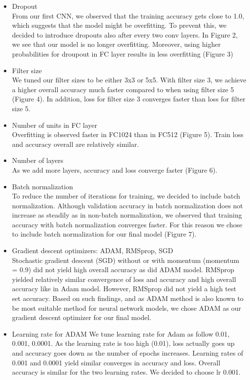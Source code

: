 \documentclass[12pt]{article}
\begin{document}
	\begin{itemize}
		\item Dropout\\
		From our first CNN, we observed that the training accuracy gets close to 1.0, which suggests that the model might be overfitting. To prevent this, we decided to introduce dropouts also after every two conv layers. In Figure 2, we see that our model is no longer overfitting. Moreover, using higher probabilities for droupout in FC layer results in less overfitting (Figure 3)
		
		\item Filter size\\
		We tuned our filter sizes to be either 3x3 or 5x5. With filter size 3, we achieve a higher overall accuracy much faster compared to when using filter size 5 (Figure 4). In addition, loss for filter size 3 converges faster than loss for filter size 5. 
		
		\item Number of units in FC layer\\
		Overfitting is observed faster in FC1024 than in FC512 (Figure 5). Train loss and accuracy overall are relatively similar. 
		
		\item Number of layers\\
		As we add more layers, accuracy and loss converge faster (Figure 6).
		
		\item Batch normalization\\
		To reduce the number of iterations for training, we decided to include batch normalization. Although validation accuracy in batch normalization does not increase as steadily as in non-batch normalization, we observed that training accuracy with batch normalization converges faster. For this reason we chose to include batch normalization for our final model (Figure 7).
				
		\item Gradient descent optimizers: ADAM, RMSprop, SGD\\
		Stochastic gradient descent (SGD) without or with momentum (momentum = 0.9) did not yield high overall accuracy as did ADAM model. RMSprop yielded relatively similar convergence of loss and accuracy and high overall accuracy like in Adam model. However, RMSprop did not yield a high test set accuracy. Based on such findings, and as ADAM method is also known to be most suitable method for neural network models, we chose ADAM as our gradient descent optimizer for our final model. 
		
		\item Learning rate for ADAM
		We tune learning rate for Adam as follow 0.01, 0.001, 0.0001. As the learning rate is too high (0.01), loss actually goes up and accuracy goes down as the number of epochs increases. Learning rates of 0.001 and 0.0001 yield similar converges in accuracy and loss. Overall accuracy is similar for the two learning rates. We decided to choose lr 0.001.  
	\end{itemize}
\end{document}

